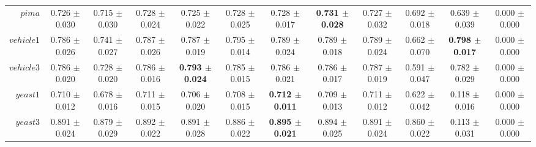 \begin{table}[!ht]
{\begin{tabular}{r c c c c c c c c c c c}
$pima$ & 0.726 $\pm$ 0.030 & 0.715 $\pm$ 0.030 & 0.728 $\pm$ 0.024 & 0.725 $\pm$ 0.022 & 0.728 $\pm$ 0.025 & 0.728 $\pm$ 0.017 & \textbf{0.731 $\pm$ 0.028} & 0.727 $\pm$ 0.032 & 0.692 $\pm$ 0.018 & 0.639 $\pm$ 0.039 & 0.000 $\pm$ 0.000 \\
$vehicle1$ & 0.786 $\pm$ 0.026 & 0.741 $\pm$ 0.027 & 0.787 $\pm$ 0.026 & 0.787 $\pm$ 0.019 & 0.795 $\pm$ 0.014 & 0.789 $\pm$ 0.024 & 0.789 $\pm$ 0.018 & 0.789 $\pm$ 0.024 & 0.662 $\pm$ 0.070 & \textbf{0.798 $\pm$ 0.017} & 0.000 $\pm$ 0.000 \\
$vehicle3$ & 0.786 $\pm$ 0.020 & 0.728 $\pm$ 0.020 & 0.786 $\pm$ 0.016 & \textbf{0.793 $\pm$ 0.024} & 0.785 $\pm$ 0.015 & 0.786 $\pm$ 0.021 & 0.786 $\pm$ 0.017 & 0.787 $\pm$ 0.019 & 0.591 $\pm$ 0.047 & 0.782 $\pm$ 0.029 & 0.000 $\pm$ 0.000 \\
$yeast1$ & 0.710 $\pm$ 0.012 & 0.678 $\pm$ 0.016 & 0.711 $\pm$ 0.015 & 0.706 $\pm$ 0.020 & 0.708 $\pm$ 0.015 & \textbf{0.712 $\pm$ 0.011} & 0.709 $\pm$ 0.013 & 0.711 $\pm$ 0.012 & 0.622 $\pm$ 0.042 & 0.118 $\pm$ 0.016 & 0.000 $\pm$ 0.000 \\
$yeast3$ & 0.891 $\pm$ 0.024 & 0.879 $\pm$ 0.029 & 0.892 $\pm$ 0.022 & 0.891 $\pm$ 0.028 & 0.886 $\pm$ 0.022 & \textbf{0.895 $\pm$ 0.021} & 0.894 $\pm$ 0.025 & 0.891 $\pm$ 0.024 & 0.860 $\pm$ 0.022 & 0.113 $\pm$ 0.031 & 0.000 $\pm$ 0.000 \\
\end{tabular}}
\end{table}
